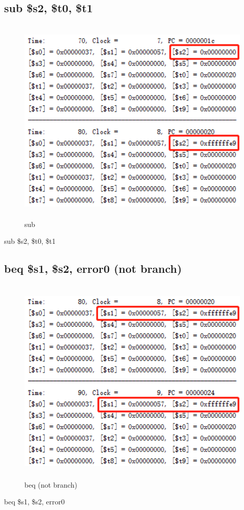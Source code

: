 \documentclass{article}
\begin{document}
\subsection{sub \$s2, \$t0, \$t1}
\begin{figure}[H]
    \centering
    \includegraphics[height = 10cm,width = 13cm]{sub.png}
    \caption{sub}
    \label{fig:my_label}
\end{figure}

sub \$s2, \$t0, \$t1
\subsection{beq \$s1, \$s2, error0 (not branch)}
\begin{figure}[H]
    \centering
    \includegraphics[height = 10cm,width = 13cm]{beq_not.png}
    \caption{beq (not branch)}
    \label{fig:my_label}
\end{figure}
beq \$s1, \$s2, error0
\end{document}

